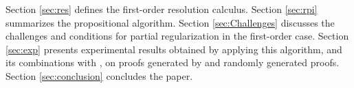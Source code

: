 Section \ref{sec:res} defines the first-order resolution calculus. Section \ref{sec:rpi} summarizes the propositional {\RPI} algorithm. 
Section \ref{sec:Challenges} discusses the challenges and conditions for partial regularization in the first-order case.
Section \ref{sec:exp} presents experimental results obtained by applying this algorithm, and its combinations with {\GFOLU}, on proofs generated by {\SPASS} \cite{Spass} and randomly generated proofs. Section \ref{sec:conclusion} concludes the paper.


